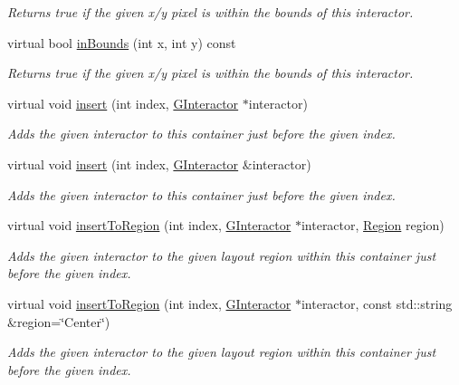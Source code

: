 \begin{DoxyCompactItemize}
\begin{DoxyCompactList}\small\item\em Returns true if the given x/y pixel is within the bounds of this interactor. \end{DoxyCompactList}\item 
virtual bool \mbox{\hyperlink{classGInteractor_ae6d7982c1c627b677a5e776ca86118ed}{in\+Bounds}} (int x, int y) const
\begin{DoxyCompactList}\small\item\em Returns true if the given x/y pixel is within the bounds of this interactor. \end{DoxyCompactList}\item 
virtual void \mbox{\hyperlink{classGContainer_afffb8f789ff9a8466fbae5b846a0ebe7}{insert}} (int index, \mbox{\hyperlink{classGInteractor}{G\+Interactor}} $\ast$interactor)
\begin{DoxyCompactList}\small\item\em Adds the given interactor to this container just before the given index. \end{DoxyCompactList}\item 
virtual void \mbox{\hyperlink{classGContainer_a2e9d7c6d9e6769d4cfd3293afe7e215c}{insert}} (int index, \mbox{\hyperlink{classGInteractor}{G\+Interactor}} \&interactor)
\begin{DoxyCompactList}\small\item\em Adds the given interactor to this container just before the given index. \end{DoxyCompactList}\item 
virtual void \mbox{\hyperlink{classGContainer_a1c4b766b059991ad7d084ea03f22f1c5}{insert\+To\+Region}} (int index, \mbox{\hyperlink{classGInteractor}{G\+Interactor}} $\ast$interactor, \mbox{\hyperlink{classGContainer_a81a01a86de31071a92e6cce0bab9bc4b}{Region}} region)
\begin{DoxyCompactList}\small\item\em Adds the given interactor to the given layout region within this container just before the given index. \end{DoxyCompactList}\item 
virtual void \mbox{\hyperlink{classGContainer_adeeb03feb9346a9cf2046427484c20bc}{insert\+To\+Region}} (int index, \mbox{\hyperlink{classGInteractor}{G\+Interactor}} $\ast$interactor, const std\+::string \&region=\char`\"{}Center\char`\"{})
\begin{DoxyCompactList}\small\item\em Adds the given interactor to the given layout region within this container just before the given index. \end{DoxyCompactList}\item 

\end{DoxyCompactItemize}
